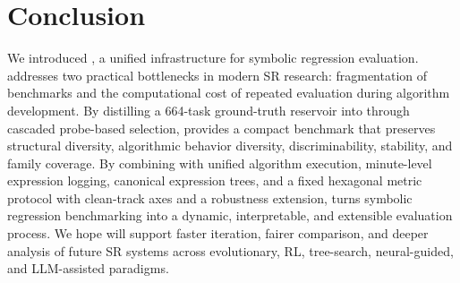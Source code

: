 \section{Conclusion}

We introduced \arena{}, a unified infrastructure for symbolic regression evaluation. \arena{} addresses two practical bottlenecks in modern SR research: fragmentation of benchmarks and the computational cost of repeated evaluation during algorithm development. By distilling a 664-task ground-truth reservoir into \core{} through cascaded probe-based selection, \arena{} provides a compact benchmark that preserves structural diversity, algorithmic behavior diversity, discriminability, stability, and family coverage. By combining \core{} with unified algorithm execution, minute-level expression logging, canonical expression trees, and a fixed hexagonal metric protocol with clean-track axes and a robustness extension, \arena{} turns symbolic regression benchmarking into a dynamic, interpretable, and extensible evaluation process. We hope \arena{} will support faster iteration, fairer comparison, and deeper analysis of future SR systems across evolutionary, RL, tree-search, neural-guided, and LLM-assisted paradigms.
